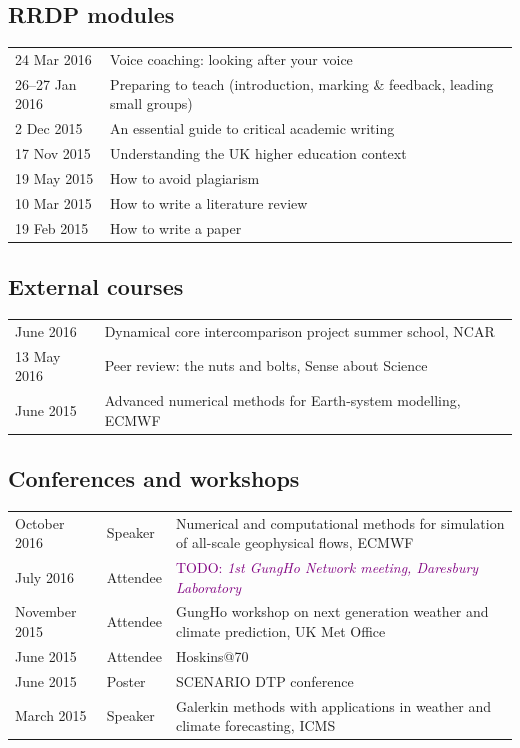 \documentclass[a4paper,11pt]{article}
\newcommand{\TODO}[1]{\textcolor{purple}{TODO: \emph{#1}}}
\begin{document}
\subsection*{RRDP modules}
\begin{tabular}{l l}
24 Mar 2016	& Voice coaching: looking after your voice \\
26--27 Jan 2016 & Preparing to teach (introduction, marking \& feedback, leading small groups) \\
2 Dec 2015	& An essential guide to critical academic writing \\
17 Nov 2015	& Understanding the UK higher education context \\
19 May 2015	& How to avoid plagiarism \\
10 Mar 2015	& How to write a literature review \\
19 Feb 2015	& How to write a paper \\
\end{tabular}

\subsection*{External courses}
\begin{tabular}{l l}
June 2016 & Dynamical core intercomparison project summer school, NCAR \\
13 May 2016 & Peer review: the nuts and bolts, Sense about Science \\
June 2015 & Advanced numerical methods for Earth-system modelling, ECMWF \\
\end{tabular}

\subsection*{Conferences and workshops}
\begin{tabularx}{\linewidth}{l l X}
October 2016 & Speaker & Numerical and computational methods for simulation of all-scale geophysical flows, ECMWF \\
July 2016 & Attendee & \TODO{1st GungHo Network meeting, Daresbury Laboratory} \\
November 2015 & Attendee & GungHo workshop on next generation weather and climate prediction, UK Met Office \\
June 2015 & Attendee & Hoskins@70 \\
June 2015 & Poster & SCENARIO DTP conference \\
March 2015 & Speaker & Galerkin methods with applications in weather and climate forecasting, ICMS \\
\end{tabularx}
\end{document}
